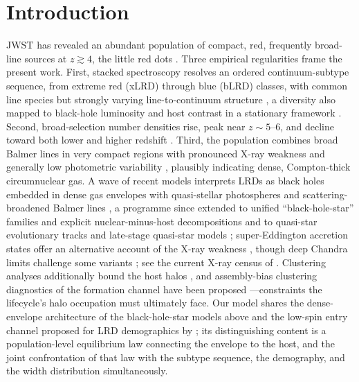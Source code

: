 \documentclass[twocolumn]{aastex631}
\begin{document}

\section{Introduction}\label{sec:intro}
JWST has revealed an abundant population of compact, red, frequently
broad-line sources at $z\gtrsim4$, the little red dots
\citep{Matthee2024,Greene2024,Akins2024,Kocevski2025}. Three
empirical regularities frame the present work. First, stacked spectroscopy
resolves an ordered continuum-subtype sequence, from extreme red (xLRD)
through blue (bLRD) classes, with common line species but strongly varying
line-to-continuum structure \citep{PerezGonzalez2026}, a diversity also
mapped to black-hole luminosity and host contrast in a stationary
framework \citep{Barro2025}. Second,
broad-selection number densities rise, peak near $z\sim5$--6, and decline
toward both lower and higher redshift \citep{Rinaldi2026,Ma2026}. Third,
the population combines broad Balmer lines in very compact regions with
pronounced X-ray weakness
\citep{Ananna2024,Yue2024,Maiolino2024,Sneppen2026} and generally low
photometric variability \citep[][the last for a five-object
sample]{Tee2024,Secunda2025,KokuboHarikane2024},
plausibly indicating dense, Compton-thick circumnuclear gas. A wave of
recent models interprets LRDs as black holes embedded in dense gas
envelopes with quasi-stellar photospheres and scattering-broadened Balmer
lines \citep{Naidu2025,Rusakov2025,deGraaff2025,Sneppen2026b}, a programme
since extended to unified ``black-hole-star'' families and explicit
nuclear-minus-host decompositions \citep{deGraaff2025b,Sun2026}
and to quasi-star evolutionary tracks and late-stage quasi-star models
\citep{Santarelli2025,Begelman2026,Kido2025};
super-Eddington accretion states offer an alternative account of the
X-ray weakness \citep{PacucciNarayan2024,Inayoshi2024}, though deep
Chandra limits challenge some variants \citep[e.g.,][]{Sacchi2025}; see
the current X-ray census of \citet{Tortosa2026}.
Clustering analyses additionally bound the host halos
\citep{Pizzati2025,Carranza2025}, and assembly-bias clustering
diagnostics of the formation channel have been proposed
\citep{Wang2026}---constraints the lifecycle's
halo occupation must ultimately face. Our model shares the
dense-envelope architecture of the black-hole-star models above and the
low-spin entry channel proposed for
LRD demographics by \citet{PacucciLoeb2025}; its distinguishing content
is a population-level equilibrium law connecting the envelope to the
host, and the joint confrontation of that law with the subtype sequence,
the demography, and the width distribution simultaneously.
\end{document}
